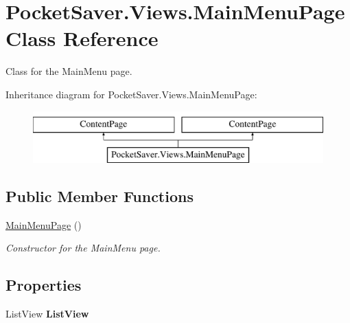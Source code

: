 \hypertarget{class_pocket_saver_1_1_views_1_1_main_menu_page}{}\section{Pocket\+Saver.\+Views.\+Main\+Menu\+Page Class Reference}
\label{class_pocket_saver_1_1_views_1_1_main_menu_page}


Class for the Main\+Menu page.  


Inheritance diagram for Pocket\+Saver.\+Views.\+Main\+Menu\+Page\+:\begin{figure}[H]
\begin{center}
\leavevmode
\includegraphics[height=2.000000cm]{class_pocket_saver_1_1_views_1_1_main_menu_page}
\end{center}
\end{figure}
\subsection*{Public Member Functions}
\begin{DoxyCompactItemize}
\item 
\hyperlink{class_pocket_saver_1_1_views_1_1_main_menu_page_aee8c6fc4d2a5fb1f7ee53f9175d2c84d}{Main\+Menu\+Page} ()
\begin{DoxyCompactList}\small\item\em Constructor for the Main\+Menu page. \end{DoxyCompactList}\end{DoxyCompactItemize}
\subsection*{Properties}
\begin{DoxyCompactItemize}
\item 
\mbox{\label{class_pocket_saver_1_1_views_1_1_main_menu_page_a9abb113a5c4417cd6072bb967b8aa98d}} 
List\+View {\bfseries List\+View}
\end{DoxyCompactItemize}


